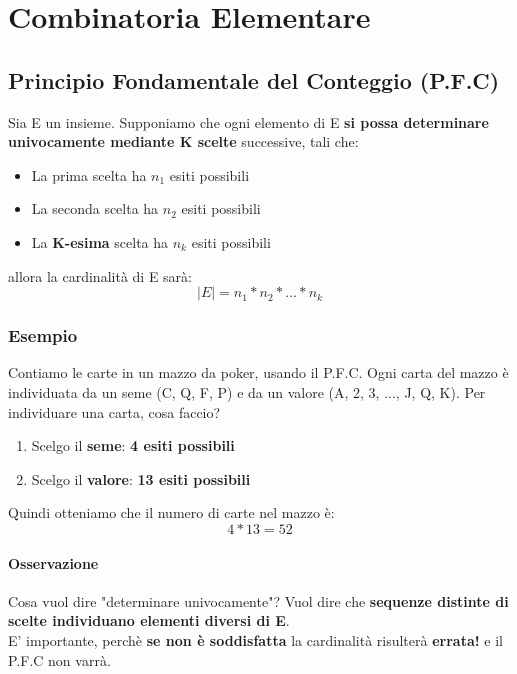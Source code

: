 \documentclass{report}
\begin{document}
\section{Combinatoria Elementare}
\subsection{Principio Fondamentale del Conteggio (P.F.C)}
Sia E un insieme. Supponiamo che ogni elemento di E \textbf{si possa determinare univocamente mediante K scelte }successive, tali che: \begin{itemize}
    \item La prima scelta ha \(n_1\) esiti possibili
    \item La seconda scelta ha \(n_2\) esiti possibili
    \item La \textbf{K-esima} scelta ha \(n_k\) esiti possibili
\end{itemize}
allora la cardinalità di E sarà: \[|E| = n_1*n_2*...*n_k\]
\subsubsection{Esempio}
Contiamo le carte in un mazzo da poker, usando il P.F.C. Ogni carta del mazzo è individuata da un seme (C, Q, F, P) e da un valore (A, 2, 3, ..., J, Q, K). Per individuare una carta, cosa faccio? \begin{enumerate}
    \item Scelgo il \textbf{seme}: \textbf{4 esiti possibili}
    \item Scelgo il \textbf{valore}: \textbf{13 esiti possibili}
\end{enumerate}
Quindi otteniamo che il numero di carte nel mazzo è: \[4*13 = 52\]
\paragraph{Osservazione} Cosa vuol dire "determinare univocamente"? Vuol dire che \textbf{sequenze distinte di scelte individuano elementi diversi di E}.\\ 
E' importante, perchè \textbf{se non è soddisfatta} la cardinalità risulterà \textbf{errata!} e il P.F.C non varrà.
\end{document}
